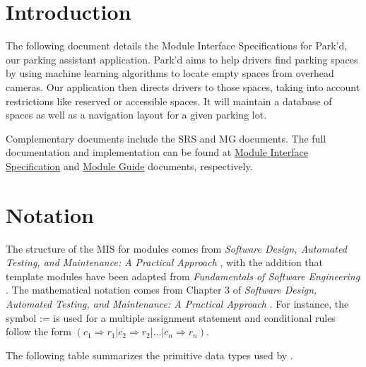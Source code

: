 \documentclass[12pt, titlepage]{article}
\begin{document}
\section{Introduction}

The following document details the Module Interface Specifications for Park'd,
our parking assistant application. Park'd aims to help drivers find parking
spaces by using machine learning algorithms to locate empty spaces from overhead
cameras. Our application then directs drivers to those spaces, taking into
account restrictions like reserved or accessible spaces. It will maintain a
database of spaces as well as a navigation layout for a given parking lot.

Complementary documents include the SRS and MG documents. The full documentation
and implementation can be found at
\href{https://github.com/parkd-app/park-d/blob/main/docs/Design/SoftDetailedDes/MIS.pdf}{Module
Interface Specification} and
\href{https://github.com/parkd-app/park-d/blob/main/docs/Design/SoftArchitecture/MG.pdf}{Module
Guide} documents, respectively.

\section{Notation}

The structure of the MIS for modules comes from \emph{Software Design, Automated
Testing, and Maintenance: A Practical Approach} \cite{HoffmanAndStrooper1995},
with the addition that template modules have been adapted from
\emph{Fundamentals of Software Engineering} \cite{GhezziEtAl2003}.  The
mathematical notation comes from Chapter 3 of \emph{Software Design, Automated
Testing, and Maintenance: A Practical Approach} \cite{HoffmanAndStrooper1995}.
For instance, the symbol := is used for a multiple assignment statement and
conditional rules follow the form $(c_1 \Rightarrow r_1 | c_2 \Rightarrow r_2 |
... | c_n \Rightarrow r_n )$.

\newpage
The following table summarizes the primitive data types used by \progname. 
\end{document}
